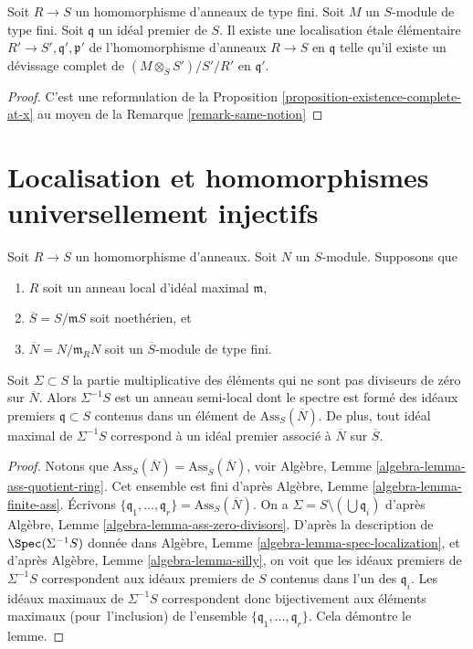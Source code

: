 \begin{lemma}
\label{lemma-existence-algebra}
Soit $R \to S$ un homomorphisme d'anneaux de type fini.
Soit $M$ un $S$-module de type fini.
Soit $\mathfrak q$ un idéal premier de $S$.
Il existe une localisation \'etale élémentaire
$R' \to S', \mathfrak q', \mathfrak p'$ de
l'homomorphisme d'anneaux $R \to S$ en $\mathfrak q$ telle qu'il
existe un d\'evissage complet de
$(M \otimes_S S')/S'/R'$ en $\mathfrak q'$.
\end{lemma}

\begin{proof}
C'est une reformulation de la
Proposition \ref{proposition-existence-complete-at-x}
au moyen de la
Remarque \ref{remark-same-notion}
\end{proof}




\section{Localisation et homomorphismes universellement injectifs}
\label{section-localize-universally-injective}


\begin{lemma}
\label{lemma-homothety-spectrum}
Soit $R \to S$ un homomorphisme d'anneaux.
Soit $N$ un $S$-module.
Supposons que
\begin{enumerate}
\item $R$ soit un anneau local d'idéal maximal $\mathfrak m$,
\item $\overline{S} = S/\mathfrak m S$ soit noethérien, et
\item $\overline{N} = N/\mathfrak m_R N$ soit un $\overline{S}$-module de type fini.
\end{enumerate}
Soit $\Sigma \subset S$ la partie multiplicative des éléments qui ne sont pas
diviseurs de zéro sur $\overline{N}$. Alors $\Sigma^{-1}S$ est un anneau semi-local
dont le spectre est formé des idéaux premiers $\mathfrak q \subset S$ contenus dans un
élément de $\text{Ass}_S(\overline{N})$. De plus, tout idéal
maximal de $\Sigma^{-1}S$ correspond à un idéal premier associé à
$\overline{N}$ sur $\overline{S}$.
\end{lemma}

\begin{proof}
Notons que
$\text{Ass}_S(\overline{N}) = \text{Ass}_{\overline{S}}(\overline{N})$, voir
Algèbre, Lemme \ref{algebra-lemma-ass-quotient-ring}.
Cet ensemble est fini d'après
Algèbre, Lemme \ref{algebra-lemma-finite-ass}.
Écrivons $\{\mathfrak q_1, \ldots, \mathfrak q_r\} = \text{Ass}_S(\overline{N})$.
On a $\Sigma = S \setminus (\bigcup \mathfrak q_i)$ d'après
Algèbre, Lemme \ref{algebra-lemma-ass-zero-divisors}.
D'après la description de $\Spec(\Sigma^{-1}S)$ donnée dans
Algèbre, Lemme \ref{algebra-lemma-spec-localization},
et d'après
Algèbre, Lemme \ref{algebra-lemma-silly},
on voit que les idéaux premiers de $\Sigma^{-1}S$ correspondent aux idéaux premiers de
$S$ contenus dans l'un des $\mathfrak q_i$.
Les idéaux maximaux de $\Sigma^{-1}S$ correspondent donc bijectivement aux
éléments maximaux (pour\ l'inclusion) de l'ensemble
$\{\mathfrak q_1, \ldots, \mathfrak q_r\}$. Cela démontre le lemme.
\end{proof}

